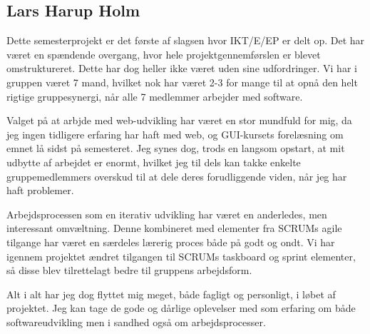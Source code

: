 \subsection*{Lars Harup Holm}
Dette semesterprojekt er det første af slagsen hvor IKT/E/EP er delt op. Det har været en spændende overgang, hvor hele projektgennemførslen er blevet omstruktureret. Dette har dog heller ikke været uden sine udfordringer. Vi har i gruppen været 7 mand, hvilket nok har været 2-3 for mange til at opnå den helt rigtige gruppesynergi, når alle 7 medlemmer arbejder med software.

Valget på at arbjde med web-udvikling har været en stor mundfuld for mig, da jeg ingen tidligere erfaring har haft med web, og  GUI-kursets forelæsning om emnet lå sidst på semesteret. Jeg synes dog, trods en langsom opstart, at mit udbytte af arbejdet er enormt, hvilket jeg til dels kan takke enkelte gruppemedlemmers overskud til at dele deres forudliggende viden, når jeg har haft problemer.

Arbejdsprocessen som en iterativ udvikling har været en anderledes, men interessant omvæltning. Denne kombineret med elementer fra SCRUMs agile tilgange har været en særdeles lærerig proces både på godt og ondt. Vi har igennem projektet ændret tilgangen til SCRUMs taskboard og sprint elementer, så disse blev tilrettelagt bedre til gruppens arbejdsform. %

Alt i alt har jeg dog flyttet mig meget, både fagligt og personligt, i løbet af projektet. Jeg kan tage de gode og dårlige oplevelser med som erfaring om både softwareudvikling men i sandhed også om arbejdsprocesser.